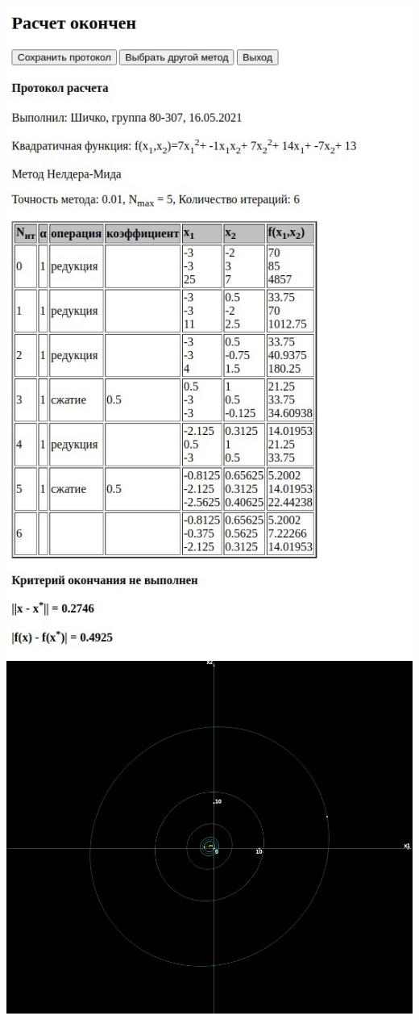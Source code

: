 \includegraphics[width=0.8\linewidth]{images/4_prot.jpg}\\
\includegraphics[width=\linewidth]{images/4_image.jpg}\\

\pagebreak
